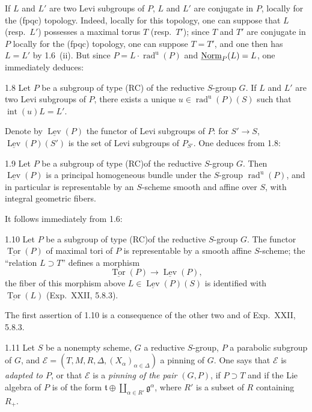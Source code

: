 If $L$ and $L'$ are two Levi subgroups of $P$, $L$ and $L'$ are conjugate in $P$, locally for the (fpqc) topology. Indeed, locally for this topology, one can suppose that $L$ (resp.~$L'$) possesses a maximal torus $T$ (resp.~$T'$); since $T$ and $T'$ are conjugate in $P$ locally for the (fpqc) topology, one can suppose $T=T'$, and one then has $L=L'$ by 1.6~(ii). But since $P=L\cdot\operatorname{rad}^{\mathrm u}(P)$ and $\underline{\mathrm{Norm}}_P(L)=L$, one immediately deduces:
\begin{corollary}{1.8}\label{XXVI.1.8}
Let $P$ be a subgroup of type (RC) of the reductive $S$-group $G$. If $L$ and $L'$ are two Levi subgroups of $P$, there exists a unique $u\in\operatorname{rad}^{\mathrm u}(P)(S)$ such that $\operatorname{int}(u)L=L'$.
\end{corollary}
Denote by $\underline{\operatorname{Lev}}(P)$ the functor of Levi subgroups of $P$: for $S'\to S$, $\underline{\operatorname{Lev}}(P)(S')$ is the set of Levi subgroups of $P_{S'}$. One deduces from 1.8:
\begin{corollary}{1.9}\label{XXVI.1.9}
Let $P$ be a subgroup of type (RC)\footnotemark[4] of the reductive $S$-group $G$. Then $\underline{\operatorname{Lev}}(P)$ is a principal homogeneous bundle under the $S$-group $\operatorname{rad}^{\mathrm u}(P)$, and in particular is representable by an $S$-scheme smooth and affine over $S$, with integral geometric fibers.
\end{corollary}
It follows immediately from 1.6:
\begin{corollary}{1.10}\label{XXVI.1.10}
Let $P$ be a subgroup of type (RC)\footnotemark[4] of the reductive $S$-group $G$. The functor $\underline{\operatorname{Tor}}(P)$ of maximal tori of $P$ is representable by a smooth affine $S$-scheme; the ``relation $L\supset T$'' defines a morphism
\[
\underline{\operatorname{Tor}}(P)\to\underline{\operatorname{Lev}}(P),
\]
the fiber of this morphism above $L\in\underline{\operatorname{Lev}}(P)(S)$ is identified with $\underline{\operatorname{Tor}}(L)$ (Exp.~XXII, 5.8.3).
\end{corollary}
The first assertion of 1.10 is a consequence of the other two and of Exp.~XXII, 5.8.3.
\begin{definition}{1.11}\label{XXVI.1.11}
Let $S$ be a nonempty scheme, $G$ a reductive $S$-group, $P$ a parabolic subgroup of $G$, and $\mathcal E=(T,M,R,\Delta,(X_\alpha)_{\alpha\in\Delta})$ a pinning of $G$. One says that $\mathcal E$ is \emph{adapted to $P$}, or that $\mathcal E$ is a \emph{pinning of the pair $(G,P)$}, if $P\supset T$ and if the Lie algebra of $P$ is of the form $\mathfrak t\oplus\coprod_{\alpha\in R'}\mathfrak g^\alpha$, where $R'$ is a subset of $R$ containing $R_+$.
\end{definition}

